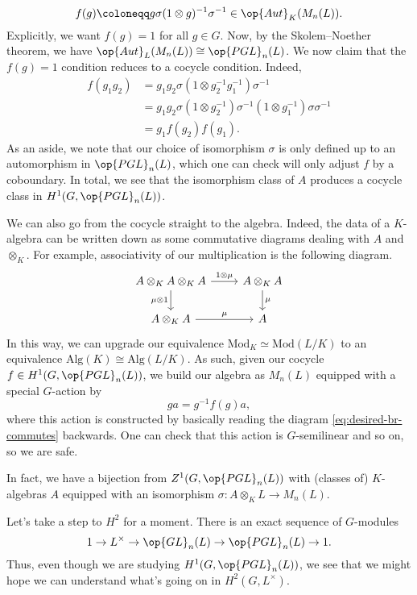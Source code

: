 \documentclass[../notes.tex]{subfiles}
\begin{document}
\[f(g)\coloneqq g\sigma(1\otimes g)^{-1}\sigma^{-1}\in\op{Aut}_K(M_n(L)).\]
Explicitly, we want $f(g)=1$ for all $g\in G$. Now, by the Skolem--Noether theorem, we have $\op{Aut}_L(M_n(L))\cong\op{PGL}_n(L)$. We now claim that the $f(g)=1$ condition reduces to a cocycle condition. Indeed,
\begin{align*}
	f(g_1g_2) &= g_1g_2\sigma\left(1\otimes g_2^{-1}g_1^{-1}\right)\sigma^{-1} \\
	&= g_1g_2\sigma\left(1\otimes g_2^{-1}\right)\sigma^{-1}\left(1\otimes g_1^{-1}\right)\sigma\sigma^{-1} \\
	&= g_1f(g_2)f(g_1).
\end{align*}
As an aside, we note that our choice of isomorphism $\sigma$ is only defined up to an automorphism in $\op{PGL}_n(L)$, which one can check will only adjust $f$ by a coboundary. In total, we see that the isomorphism class of $A$ produces a cocycle class in $H^1(G,\op{PGL}_n(L))$.

We can also go from the cocycle straight to the algebra. Indeed, the data of a $K$-algebra can be written down as some commutative diagrams dealing with $A$ and $\otimes_K$. For example, associativity of our multiplication is the following diagram.
\[\begin{tikzcd}
	{A\otimes_KA\otimes_KA} & {A\otimes_KA} \\
	{A\otimes_KA} & A
	\arrow["1\otimes\mu", from=1-1, to=1-2]
	\arrow["\mu\otimes1"', from=1-1, to=2-1]
	\arrow["\mu", from=2-1, to=2-2]
	\arrow["\mu", from=1-2, to=2-2]
\end{tikzcd}\]
In this way, we can upgrade our equivalence $\mathrm{Mod}_K\simeq\mathrm{Mod}(L/K)$ to an equivalence $\mathrm{Alg}(K)\cong\mathrm{Alg}(L/K)$. As such, given our cocycle $f\in H^1(G,\op{PGL}_n(L))$, we build our algebra as $M_n(L)$ equipped with a special $G$-action by
\[ga=g^{-1}f(g)a,\]
where this action is constructed by basically reading the diagram \eqref{eq:desired-br-commutes} backwards. One can check that this action is $G$-semilinear and so on, so we are safe.
\begin{remark}
	In fact, we have a bijection from $Z^1(G,\op{PGL}_n(L))$ with (classes of) $K$-algebras $A$ equipped with an isomorphism $\sigma\colon A\otimes_KL\to M_n(L)$.
\end{remark}
Let's take a step to $H^2$ for a moment. There is an exact sequence of $G$-modules
\[1\to L^\times\to\op{GL}_n(L)\to\op{PGL}_n(L)\to1.\]
Thus, even though we are studying $H^1(G,\op{PGL}_n(L))$, we see that we might hope we can understand what's going on in $H^2\left(G,L^\times\right)$.
\end{document}
